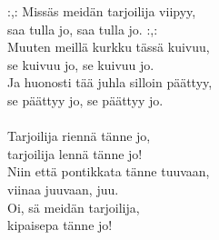 
:,: Missäs meidän tarjoilija viipyy, \\ saa tulla jo, saa tulla jo. :,: \\ Muuten meillä kurkku tässä kuivuu, \\ se kuivuu jo, se kuivuu jo. \\ Ja huonosti tää juhla silloin päättyy, \\ se päättyy jo, se päättyy jo. \\ \hspace{10mm} \\ Tarjoilija riennä tänne jo, \\ tarjoilija lennä tänne jo! \\ Niin että pontikkata tänne tuuvaan, \\ viinaa juuvaan, juu. \\ Oi, sä meidän tarjoilija, \\ kipaisepa tänne jo!